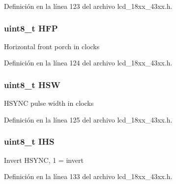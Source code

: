 Definición en la línea 123 del archivo lcd\+\_\+18xx\+\_\+43xx.\+h.

\subsubsection[{\texorpdfstring{H\+FP}{HFP}}]{\setlength{\rightskip}{0pt plus 5cm}uint8\+\_\+t H\+FP}\hypertarget{struct_l_c_d___c_o_n_f_i_g___t_a112e61ab46db6540b52169064d586516}{}\label{struct_l_c_d___c_o_n_f_i_g___t_a112e61ab46db6540b52169064d586516}
Horizontal front porch in clocks 

Definición en la línea 124 del archivo lcd\+\_\+18xx\+\_\+43xx.\+h.

\subsubsection[{\texorpdfstring{H\+SW}{HSW}}]{\setlength{\rightskip}{0pt plus 5cm}uint8\+\_\+t H\+SW}\hypertarget{struct_l_c_d___c_o_n_f_i_g___t_ac0cbd6f77d175aae7895c50dd52dacbc}{}\label{struct_l_c_d___c_o_n_f_i_g___t_ac0cbd6f77d175aae7895c50dd52dacbc}
H\+S\+Y\+NC pulse width in clocks 

Definición en la línea 125 del archivo lcd\+\_\+18xx\+\_\+43xx.\+h.

\subsubsection[{\texorpdfstring{I\+HS}{IHS}}]{\setlength{\rightskip}{0pt plus 5cm}uint8\+\_\+t I\+HS}\hypertarget{struct_l_c_d___c_o_n_f_i_g___t_a631c2cdd59463385b8d5b7c1e96a28d0}{}\label{struct_l_c_d___c_o_n_f_i_g___t_a631c2cdd59463385b8d5b7c1e96a28d0}
Invert H\+S\+Y\+NC, 1 = invert 

Definición en la línea 133 del archivo lcd\+\_\+18xx\+\_\+43xx.\+h.


